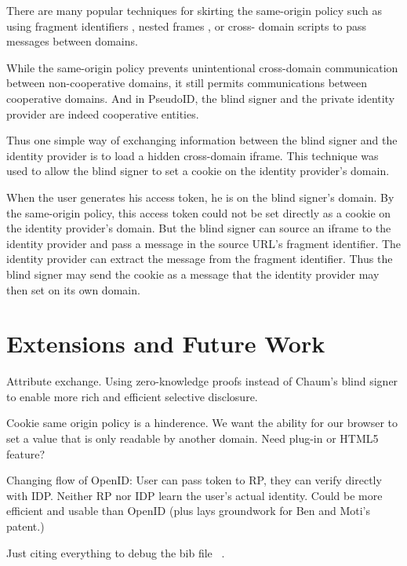 \documentclass{llncs}
\begin{document}
There are many popular techniques for skirting the same-origin policy such as
using fragment identifiers \cite{Adi07}, nested frames \cite{JaWa07}, or cross-
domain scripts to pass messages between domains.

While the same-origin policy prevents unintentional cross-domain communication
between non-cooperative domains, it still permits communications between
cooperative domains. And in PseudoID, the blind signer and the private identity
provider are indeed cooperative entities.

Thus one simple way of exchanging information between the blind signer and the
identity provider is to load a hidden cross-domain iframe. This technique was
used to allow the blind signer to set a cookie on the identity provider's
domain.

When the user generates his access token, he is on the blind signer's domain. By
the same-origin policy, this access token could not be set directly as a cookie
on the identity provider's domain. But the blind signer can source an iframe to
the identity provider and pass a message in the source URL's fragment
identifier. The identity provider can extract the message from the fragment
identifier. Thus the blind signer may send the cookie as a message that the
identity provider may then set on its own domain.

\section{Extensions and Future Work}

Attribute exchange. Using zero-knowledge proofs instead of Chaum's
blind signer to enable more rich and efficient selective
disclosure.

Cookie same origin policy is a hinderence. We want the ability for our
browser to set a value that is only readable by another domain. Need
plug-in or HTML5 feature?

Changing flow of OpenID: User can pass token to RP, they can verify
directly with IDP. Neither RP nor IDP learn the user's actual
identity. Could be more efficient and usable than OpenID (plus lays
groundwork for Ben and Moti's patent.)

Just citing everything to debug the bib file~
\cite{Cha82,Cha85,GMR89,Json,PyOpenId,ProviderApp,Jsbn,JaWa07,Adi07}.



\end{document}
